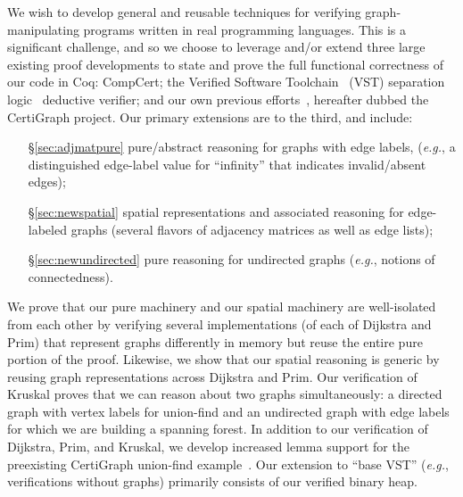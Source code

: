 We wish to develop general and reusable techniques for verifying graph-manipulating programs written in real programming languages.  This is a significant challenge, and so we choose to leverage and/or extend three large existing proof developments to state and prove the full functional correctness of our code in Coq: CompCert; the Verified Software Toolchain~\cite{appel:programlogics} (VST) separation logic~\cite{o2001local} deductive verifier; and our own previous efforts~\cite{DBLP:journals/pacmpl/WangCMH19}, hereafter dubbed the CertiGraph project.  Our primary extensions are to the third, and include:
\begin{enumerate}
\item[\S\ref{sec:adjmatpure}] pure/abstract reasoning for graphs with edge labels,
(\emph{e.g.}, a distinguished edge-label value for ``infinity'' that indicates invalid/absent edges);
\item[\S\ref{sec:newspatial}] spatial representations and associated reasoning for edge-labeled graphs (several flavors of adjacency matrices as well as edge lists);
\item[\S\ref{sec:newundirected}] pure reasoning for undirected graphs (\emph{e.g.}, notions of connectedness).
\end{enumerate}
We prove that our pure machinery and our spatial machinery are well-isolated from each other by verifying several implementations (of each of Dijkstra and Prim) that represent graphs differently in memory but reuse the entire pure portion of the proof.  Likewise, we show that our spatial reasoning is generic by reusing graph representations across Dijkstra and Prim.  Our verification of Kruskal proves that we can reason about two graphs simultaneously: a directed graph with vertex labels for union-find and an undirected graph with edge labels for which we are building a spanning forest.
In addition to our verification of Dijkstra, Prim, and Kruskal, we develop increased lemma support for the preexisting CertiGraph union-find example~\cite{DBLP:journals/pacmpl/WangCMH19}.  Our extension to ``base VST'' (\emph{e.g.}, verifications without graphs) primarily consists of our verified binary heap.




